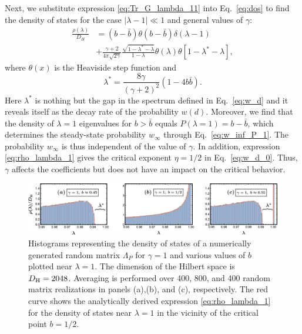 \documentclass[%
 reprint,
 superscriptaddress,
 amsmath,amssymb,
prx,
]{revtex4-2}\href{\href{}{}}{}
\begin{document}
Next, we substitute expression \eqref{eq:Tr_G_lambda_11} into Eq.~\eqref{eq:dos} to find the density of states for the case $|\lambda-1|\ll1 $ and general values of $\gamma$:
\begin{align}
    \frac{\rho(\lambda)}{D_H}&=(b-\bar b)\theta(b-\bar b)\delta(\lambda-1) \nonumber\\ 
    &+\frac{\gamma+2}{4\pi\sqrt{2\gamma}}\frac{\sqrt{1-\lambda^{\ast}-\lambda}}{1-\lambda}\theta(\lambda)\theta\left[1-\lambda^{\ast}-\lambda\right],\label{eq:rho_lambda_1}
\end{align}
where $\theta(x)$ is the Heaviside step function and
\begin{equation}
    \lambda^{\ast} = \frac{8\gamma}{(\gamma+2)^2}(1-4 b\bar b).
    \label{eq:d_ast_1}
\end{equation}
Here $\lambda^{\ast}$ is nothing but the gap in the spectrum defined in Eq.~\eqref{eq:w_d} and it reveals itself as the decay rate of the probability $w(d)$.
Moreover, we find that the density of $\lambda=1$ eigenvalues for $b>\bar b$ equals $P(\lambda=1)=b-\bar b$, which determines the steady-state probability $w_{\infty}$ through Eq.~\eqref{eq:w_inf_P_1}.
The probability $w_{\infty}$ is thus independent of the value of $\gamma$.
In addition, expression \eqref{eq:rho_lambda_1} gives the critical exponent $\eta=1/2$ in Eq.~\eqref{eq:w_d_0}.
Thus, $\gamma$ affects the coefficients but does not have an impact on the critical behavior.

\begin{figure}
	\includegraphics[width = 2.05\columnwidth]{lam_W_distr_gamma1_gap.png}
\caption{Histograms representing the density of states of a numerically generated random matrix $\Lambda_P$ for $\gamma=1$ and various values of $b$ plotted near $\lambda=1$. The dimension of the Hilbert space is $D_{\rm H}=2048$. Averaging is performed over 400, 800, and 400 random matrix realizations in panels (a),(b), and (c), respectively. The red curve shows the analytically derived expression \eqref{eq:rho_lambda_1} for the density of states near $\lambda=1$ in the vicinity of the critical point $b=1/2$.
	}
	\label{fig:W_eval_hist_eval1_1}
\end{figure}
\end{document}

